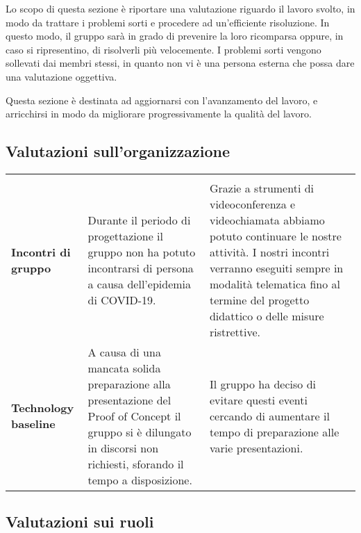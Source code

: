 \documentclass[../piano-di-qualifica.tex]{subfiles}
\begin{document}
  Lo scopo di questa sezione è riportare una valutazione riguardo il lavoro svolto, in modo da trattare
  i problemi sorti e procedere ad un'efficiente risoluzione.
  In questo modo, il gruppo sarà in grado di prevenire la loro ricomparsa oppure, in caso si ripresentino, di risolverli più velocemente.
  I problemi sorti vengono sollevati dai membri stessi, in quanto non vi è una
  persona esterna che possa dare una valutazione oggettiva.

  Questa sezione è destinata ad aggiornarsi con l'avanzamento del lavoro, e arricchirsi in modo
  da migliorare progressivamente la qualità del lavoro.

  \subsection{Valutazioni sull'organizzazione}

  \begin{longtable}[H]{>{\centering\bfseries}m{4cm} >{\centering\arraybackslash}m{6cm} >{\centering\arraybackslash}m{6cm}}
    \rowcolor{darkgray!90!}
    \color{white}{\textbf{Dominio}} & \color{white}{\textbf{Problema}} & \color{white}{\textbf{Soluzione}} \\
    Incontri di gruppo & Durante il periodo di progettazione il gruppo non ha potuto incontrarsi di persona a causa dell'epidemia di COVID-19.  & Grazie a strumenti di videoconferenza e videochiamata abbiamo potuto continuare le nostre attività. I nostri incontri verranno eseguiti sempre in modalità telematica fino al termine del progetto didattico o delle misure ristrettive.\\
    Technology baseline & A causa di una mancata solida preparazione alla presentazione del Proof of Concept il gruppo si è dilungato in discorsi non richiesti, sforando il tempo a disposizione. & Il gruppo ha deciso di evitare questi eventi cercando di aumentare il tempo di preparazione alle varie presentazioni. \\
  \end{longtable}


\newpage
  \subsection{Valutazioni sui ruoli}
\end{document}
